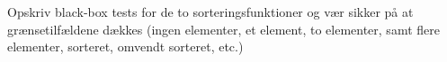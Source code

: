 Opskriv black-box tests for de to sorteringsfunktioner og vær sikker
på at grænsetilfældene dækkes (ingen elementer, et element, to
elementer, samt flere elementer, sorteret, omvendt sorteret, etc.)